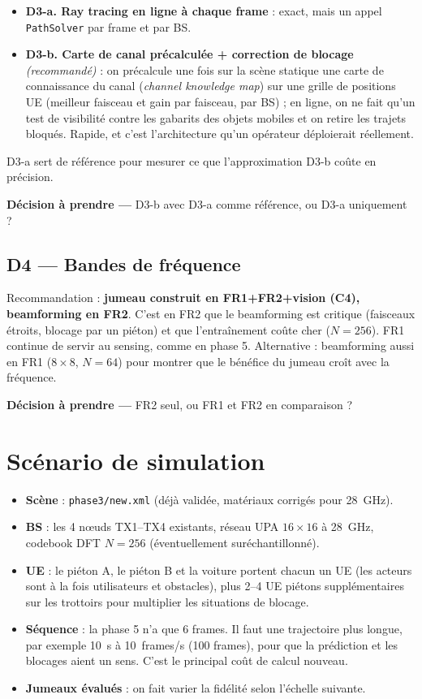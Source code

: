 \documentclass[11pt,a4paper]{article}
\newcommand{\decision}[1]{%
  \par\smallskip\noindent\colorbox{tabchoice}{\parbox{\dimexpr\linewidth-2\fboxsep}{\small\textbf{Décision à prendre --- }#1}}\par\smallskip}
\begin{document}
\begin{itemize}
  \item \textbf{D3-a. Ray tracing en ligne à chaque frame} : exact, mais un appel
        \texttt{PathSolver} par frame et par BS.
  \item \textbf{D3-b. Carte de canal précalculée + correction de blocage} \emph{(recommandé)} :
        on précalcule une fois sur la scène statique une carte de connaissance du canal
        (\textit{channel knowledge map}) sur une grille de positions UE (meilleur faisceau et gain
        par faisceau, par BS) ; en ligne, on ne fait qu'un test de visibilité contre les gabarits
        des objets mobiles et on retire les trajets bloqués. Rapide, et c'est l'architecture
        qu'un opérateur déploierait réellement.
\end{itemize}
D3-a sert de référence pour mesurer ce que l'approximation D3-b coûte en précision.

\decision{D3-b avec D3-a comme référence, ou D3-a uniquement ?}

\subsection{D4 --- Bandes de fréquence}

Recommandation : \textbf{jumeau construit en FR1+FR2+vision (C4), beamforming en FR2}. C'est en
FR2 que le beamforming est critique (faisceaux étroits, blocage par un piéton) et que
l'entraînement coûte cher ($N=256$). FR1 continue de servir au sensing, comme en phase 5.
Alternative : beamforming aussi en FR1 ($8\times8$, $N=64$) pour montrer que le bénéfice du jumeau
croît avec la fréquence.

\decision{FR2 seul, ou FR1 et FR2 en comparaison ?}

\section{Scénario de simulation}

\begin{itemize}
  \item \textbf{Scène} : \texttt{phase3/new.xml} (déjà validée, matériaux corrigés pour 28~GHz).
  \item \textbf{BS} : les 4 n\oe uds TX1--TX4 existants, réseau UPA $16\times16$ à 28~GHz,
        codebook DFT $N=256$ (éventuellement suréchantillonné).
  \item \textbf{UE} : le piéton A, le piéton B et la voiture portent chacun un UE (les acteurs sont
        à la fois utilisateurs et obstacles), plus 2--4 UE piétons supplémentaires sur les
        trottoirs pour multiplier les situations de blocage.
  \item \textbf{Séquence} : la phase 5 n'a que 6 frames. Il faut une trajectoire plus longue, par
        exemple 10~s à 10~frames/s (100 frames), pour que la prédiction et les blocages aient un
        sens. C'est le principal coût de calcul nouveau.
  \item \textbf{Jumeaux évalués} : on fait varier la fidélité selon l'échelle suivante.
\end{itemize}
\end{document}
